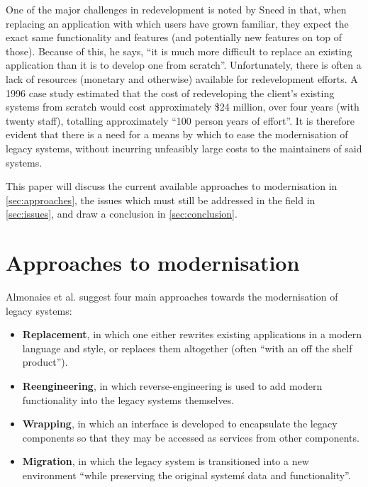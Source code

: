 \documentclass[12pt,journal,compsoc]{IEEEtran}
\begin{document}
One of the major challenges in redevelopment is noted by Sneed\cite{Sneed2011} in that, when replacing an application with which users have grown familiar, they expect the exact same functionality and features (and potentially new features on top of those). Because of this, he says, ``it is much more difficult to replace an existing application than it is to develop one from scratch''\cite{Sneed2011}. Unfortunately, there is often a lack of resources (monetary and otherwise) available for redevelopment efforts. A 1996 case study\cite{Duncan1996} estimated that the cost of redeveloping the client's existing systems from scratch would cost approximately \$24 million, over four years (with twenty staff), totalling approximately ``100 person years of effort''\cite{Duncan1996}. It is therefore evident that there is a need for a means by which to ease the modernisation of legacy systems, without incurring unfeasibly large costs to the maintainers of said systems.

This paper will discuss the current available approaches to modernisation in \autoref{sec:approaches}, the issues which must still be addressed in the field in \autoref{sec:issues}, and draw a conclusion  in \autoref{sec:conclusion}.

\section{Approaches to modernisation}
\label{sec:approaches}

Almonaies et al.\cite{Almonaies2010} suggest four main approaches towards the modernisation of legacy systems:
\begin{itemize}
\item\textbf{Replacement}, in which one either rewrites existing applications in a modern language and style, or replaces them altogether (often ``with an off the shelf product''\cite{Almonaies2010}).
\item\textbf{Reengineering}, in which reverse-engineering is used to add modern functionality into the legacy systems themselves.
\item\textbf{Wrapping}, in which an interface is developed to encapsulate the legacy components so that they may be accessed as services from other components.
\item\textbf{Migration}, in which the legacy system is transitioned into a new environment ``while preserving the original system\'s data and functionality''\cite{Almonaies2010}.
\end{itemize}
\end{document}
